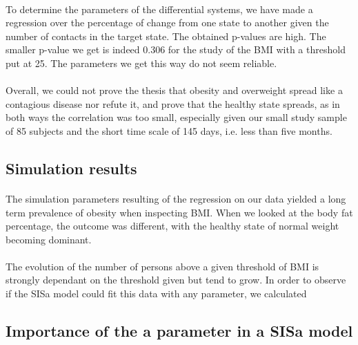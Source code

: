 \documentclass[11pt]{article}
\begin{document}
\paragraph{}
To determine the parameters of the differential systems, we have made a regression over the percentage of change from one state to another given the number of contacts in the target state. The obtained p-values are high. The smaller p-value we get is indeed 0.306 for the study of the BMI with a threshold put at 25. The parameters we get this way do not seem reliable. 

\paragraph{}

Overall, we could not prove the thesis that obesity and overweight spread like a contagious disease nor refute it, and prove that the healthy state spreads, as in both ways the correlation was too small, especially given our small study sample of 85 subjects and the short time scale of 145 days, i.e. less than five months.

\subsection{Simulation results}
\paragraph{}
The simulation parameters resulting of the regression on our data yielded a long term prevalence of obesity when inspecting BMI. When we looked at the body fat percentage, the outcome was different, with the healthy state of normal weight becoming dominant.


\paragraph{}
The evolution of the number of persons above a given threshold of BMI is strongly dependant on the threshold given but tend to grow. In order to observe if the SISa model could fit this data with any parameter, we calculated %


\subsection{Importance of the a parameter in a SISa model}
\end{document}
